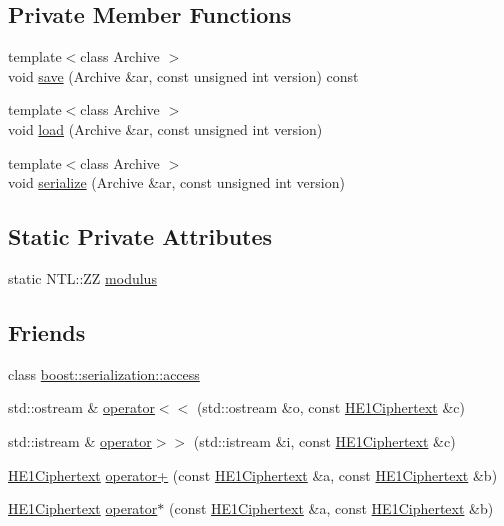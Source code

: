 \subsection*{Private Member Functions}
\begin{DoxyCompactItemize}
\item 
{\footnotesize template$<$class Archive $>$ }\\void \hyperlink{classHE1Ciphertext_a2868e8110f81031f5e6263e97a3232c0}{save} (Archive \&ar, const unsigned int version) const
\item 
{\footnotesize template$<$class Archive $>$ }\\void \hyperlink{classHE1Ciphertext_a8a9024694e1826459a53be0c7a82925e}{load} (Archive \&ar, const unsigned int version)
\item 
{\footnotesize template$<$class Archive $>$ }\\void \hyperlink{classHE1Ciphertext_ac2c27abc00dbef4ea47d7b4a3588dd1c}{serialize} (Archive \&ar, const unsigned int version)
\end{DoxyCompactItemize}
\subsection*{Static Private Attributes}
\begin{DoxyCompactItemize}
\item 
static N\+T\+L\+::\+ZZ \hyperlink{classHE1Ciphertext_a924bd87bcc91518945bc039f10a20a48}{modulus}
\end{DoxyCompactItemize}
\subsection*{Friends}
\begin{DoxyCompactItemize}
\item 
class \hyperlink{classHE1Ciphertext_ac98d07dd8f7b70e16ccb9a01abf56b9c}{boost\+::serialization\+::access}
\item 
std\+::ostream \& \hyperlink{classHE1Ciphertext_a684afdb22c43258ab0e2e5ab73abaed0}{operator$<$$<$} (std\+::ostream \&o, const \hyperlink{classHE1Ciphertext}{H\+E1\+Ciphertext} \&c)
\item 
std\+::istream \& \hyperlink{classHE1Ciphertext_a1e2c0400cdd3fca5fcd4946f9b053b8c}{operator$>$$>$} (std\+::istream \&i, const \hyperlink{classHE1Ciphertext}{H\+E1\+Ciphertext} \&c)
\item 
\hyperlink{classHE1Ciphertext}{H\+E1\+Ciphertext} \hyperlink{classHE1Ciphertext_a2e914308f6b7d88f63067fca516f4055}{operator+} (const \hyperlink{classHE1Ciphertext}{H\+E1\+Ciphertext} \&a, const \hyperlink{classHE1Ciphertext}{H\+E1\+Ciphertext} \&b)
\item 
\hyperlink{classHE1Ciphertext}{H\+E1\+Ciphertext} \hyperlink{classHE1Ciphertext_a8b5554bdd70338b6c916db1423702314}{operator$\ast$} (const \hyperlink{classHE1Ciphertext}{H\+E1\+Ciphertext} \&a, const \hyperlink{classHE1Ciphertext}{H\+E1\+Ciphertext} \&b)
\end{DoxyCompactItemize}
